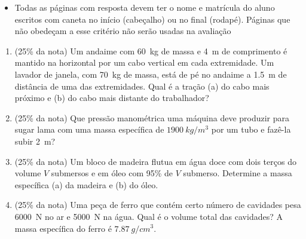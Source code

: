 \documentclass[12pt,a4paper,brazilian, fleqn]{article}
\newcommand{\ratio}[1]{(#1\% da nota)}
\begin{document}
\begin{tcolorbox}[colback=black!10, colframe=black!50, title=Observações]
    \begin{itemize}
        \item Todas as páginas com resposta devem ter o nome e matrícula do
            aluno escritos com caneta no início (cabeçalho) ou no final
            (rodapé). Páginas que não obedeçam a esse critério não serão usadas
            na avaliação
    \end{itemize}
\end{tcolorbox}

\vspace{2em}

\begin{enumerate}
    \item \ratio{25} Um andaime com \SI{60}{kg} de massa e \SI{4}{m} de comprimento é mantido
        na horizontal por um cabo vertical em cada extremidade. Um lavador de 
        janela, com \SI{70}{kg} de massa, está de pé no andaime a \SI{1.5}{m} de
        distância de uma das extremidades. Qual é a tração (a) do cabo mais próximo
        e (b) do cabo mais distante do trabalhador?

    \item \ratio{25} Que pressão manométrica uma máquina deve produzir para sugar lama
        com uma massa específica de \(\SI{1900}{kg/m^3}\) por um tubo e fazê-la 
        subir \SI{2}{m}?

    \item \ratio{25} Um bloco de madeira flutua em água doce com dois terços do volume
        \(V\) submersos e em óleo com 95\% de \(V\) submerso. Determine a 
        massa específica  (a) da madeira e (b) do óleo.

    \item \ratio{25} Uma peça de ferro que contém certo número de cavidades pesa \SI{6000}{N}
        no ar e \SI{5000}{N} na água. Qual é o volume total das cavidades?
        A massa específica do ferro é \(\SI{7.87}{g/cm^3}\).
\end{enumerate}
\end{document}
